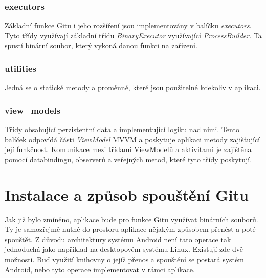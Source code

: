             \subsubsection{executors}
            Základní funkce Gitu i jeho rozšíření jsou implementovány v balíčku \emph{executors}. Tyto třídy využívají základní třídu \emph{BinaryExecutor} využívající \emph{ProcessBuilder}. Ta spustí binární soubor, který vykoná danou funkci na zařízení.

            \subsubsection{utilities}
            Jedná se o statické metody a proměnné, které jsou použitelné kdekoliv v aplikaci. 

            \subsubsection{view\_models}
            Třídy obsahující perzistentní data a implementující logiku nad nimi. Tento balíček odpovídá části \emph{ViewModel} MVVM a poskytuje aplikaci metody zajišťující její funkčnost. Komunikace mezi třídami ViewModelů a aktivitami je zajištěna pomocí databindingu, observerů a veřejných metod, které tyto třídy poskytují.
    
        \section{Instalace a způsob spouštění Gitu}
        Jak již bylo zmíněno, aplikace bude pro funkce Gitu využívat binárních souborů. Ty je samozřejmě nutné do prostoru aplikace nějakým způsobem přenést a poté spouštět. Z důvodu architektury systému Android není tato operace tak jednoduchá jako například na desktopovém systému Linux. Existují zde dvě možnosti. Buď využití knihovny o jejíž přenos a spouštění se postará systém Android, nebo tyto operace implementovat v rámci aplikace.

